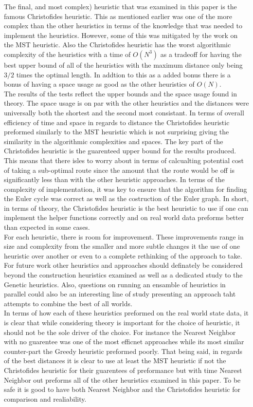 \documentclass[midd]{thesis}
\newcommand{\tab}{\hspace*{2em}}
\begin{document}
\tab The final, and most complex) heuristic that was examined in this paper is the famous Christofides heuristic. This as mentioned earlier was one of the more complex than the other heuristics in terms of the knowledge that was needed to implement the heuristics. However, some of this was mitigated by the work on the MST heuristic. Also the Christofides heuristic has the worst algorithmic complexity of the heuristics with a time of $O(N^3)$ as a tradeoff for having the best upper bound of all of the heuristics with the maximum distance only being $3/2$ times the optimal length. In addtion to this as a added bonus there is a bonus of having a space usage as good as the other heuristics of $O(N)$.\\
\tab The results of the tests reflect the upper bounds and the space usage found in theory. The space usage is on par with the other heuristics and the distances were universally both the shortest and the second most consistant. In terms of overall efficiency of time and space in regards to distance the Christofides heuristic preformed similarly to the MST heuristic which is not surprising giving the similarity in the algorithmic complexities and spaces. The key part of the Christofides heuristic is the guarenteed upper bound for the results produced. This means that there isles to worry about in terms of calcualting potential cost of taking a sub-optimal route since the amount that the route would be off is significantly less than with the other heuristic approaches. In terms of the complexity of implementation, it was key to ensure that the algorithm for finding the Euler cycle was correct as well as the costruction of the Euler graph. In short, in terms of theory, the Christofides heuristic is the best heuristic to use if one can implement the helper functions correctly and on real world data preforms better than expected in some cases.\\
\tab For each heuristic, there is room for improvement. These improvements range in size and complexity from the smaller and more subtle changes it the use of one heuristic over another or even to a complete rethinking of the approach to take. For future work other heuristics and approaches should definately be considered beyond the construction heuristics examined as well as a dedicated study to the Genetic heuristics. Also, questions on running an ensamble of heuristics in parallel could also be an interesting line of study presenting an approach taht attempts to combine the best of all worlds.\\
\tab In terms of how each of these heuristics preformed on the real world state data, it is clear that while considering theory is important for the choice of heuristic, it should not be the sole driver of the choice. For instance the Nearest Neighbor with no guarentee was one of the most efficnet approaches while its most similar counter-part the Greedy heuristic preformed poorly. That being said, in regards of the best distances it is clear to use at least the MST heuristic if not the Christofides heuristic for their guarentees of preformance but with time Nearest Neighbor out preforms all of the other heuristics examined in this paper. To be safe it is good to have both Nearest Neighbor and the Christofides heuristic for comparison and realiability. 


\end{document}
